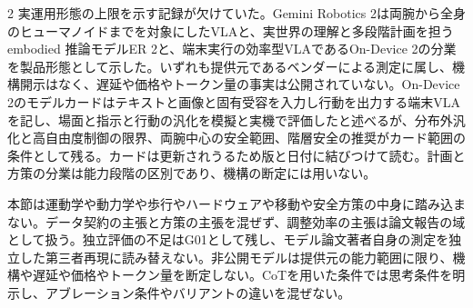 \documentclass[lualatex,a4paper,10pt]{jlreq}
\begin{document}
\begin{multicols}{2}
\noindent 実運用形態の上限を示す記録が欠けていた。Gemini Robotics 2は両腕から全身のヒューマノイドまでを対象にしたVLAと、実世界の理解と多段階計画を担う embodied 推論モデルER 2と、端末実行の効率型VLAであるOn-Device 2の分業を製品形態として示した。いずれも提供元であるベンダーによる測定に属し、機構開示はなく、遅延や価格やトークン量の事実は公開されていない。On-Device 2のモデルカードはテキストと画像と固有受容を入力し行動を出力する端末VLAを記し、場面と指示と行動の汎化を模擬と実機で評価したと述べるが、分布外汎化と高自由度制御の限界、両腕中心の安全範囲、階層安全の推奨がカード範囲の条件として残る。カードは更新されうるため版と日付に結びつけて読む。計画と方策の分業は能力段階の区別であり、機構の断定には用いない。\autocite{vmd099,vmd100}\par\medskip
\end{multicols}
\begin{claimboundary}[本節の読解上の境界]
\noindent 本節は運動学や動力学や歩行やハードウェアや移動や安全方策の中身に踏み込まない。データ契約の主張と方策の主張を混ぜず、調整効率の主張は論文報告の域として扱う。独立評価の不足はG01として残し、モデル論文著者自身の測定を独立した第三者再現に読み替えない。非公開モデルは提供元の能力範囲に限り、機構や遅延や価格やトークン量を断定しない。CoTを用いた条件では思考条件を明示し、アブレーション条件やバリアントの違いを混ぜない。\autocite{vmd093,vmd094,vmd095,vmd096,vmd097,vmd098,vmd116,vmd099,vmd100,vmd117}\par
\end{claimboundary}

\Needspace{0.20\textheight}
\end{document}
